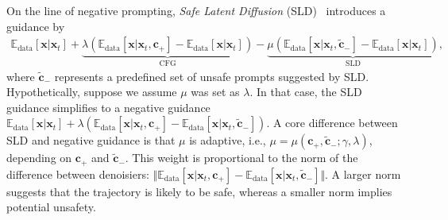 On the line of negative prompting, \textit{Safe Latent Diffusion} (SLD)~\cite{schramowski2023safe} introduces a guidance by
\begin{align}\label{eq:SLD}
    \mathbb{E}_{\text{data}}[\mathbf{x}\vert\mathbf{x}_{t}]+\underbrace{\lambda(\mathbb{E}_{\text{data}}[\mathbf{x}\vert\mathbf{x}_{t},\mathbf{c}_{+}]-\mathbb{E}_{\text{data}}[\mathbf{x}\vert\mathbf{x}_{t}])}_{\text{CFG}}-\underbrace{\mu(\mathbb{E}_{\text{data}}[\mathbf{x}\vert\mathbf{x}_{t},\tilde{\mathbf{c}}_{-}]-\mathbb{E}_{\text{data}}[\mathbf{x}\vert\mathbf{x}_{t}])}_{\text{SLD}},
\end{align}
where $\tilde{\mathbf{c}}_{-}$ represents a predefined set of unsafe prompts suggested by SLD. Hypothetically, suppose we assume $\mu$ was set as $\lambda$. In that case, the SLD guidance simplifies to a negative guidance $\mathbb{E}_{\text{data}}[\mathbf{x}\vert\mathbf{x}_{t}]+\lambda(\mathbb{E}_{\text{data}}[\mathbf{x}\vert\mathbf{x}_{t},\mathbf{c}_{+}]-\mathbb{E}_{\text{data}}[\mathbf{x}\vert\mathbf{x}_{t},\tilde{\mathbf{c}}_{-}])$. A core difference between SLD and negative guidance is that $\mu$ is adaptive, i.e., $\mu=\mu(\mathbf{c}_{+}, \tilde{\mathbf{c}}_{-}; \gamma, \lambda)$, depending on $\mathbf{c}_{+}$ and $\tilde{\mathbf{c}}_{-}$. This weight is proportional to the norm of the difference between denoisiers: $\Vert \mathbb{E}_{\text{data}}[\mathbf{x} \vert \mathbf{x}_{t}, \mathbf{c}_{+}] - \mathbb{E}_{\text{data}}[\mathbf{x} \vert \mathbf{x}_{t}, \tilde{\mathbf{c}}_{-}] \Vert$. A larger norm suggests that the trajectory is likely to be safe, whereas a smaller norm implies potential unsafety.



%


%

%
%
%
%


